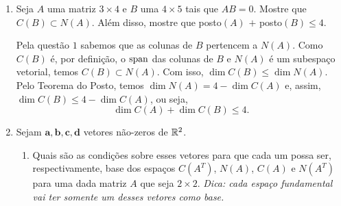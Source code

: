 \documentclass[leqno]{article}
\begin{document}
\begin{enumerate}
\begin{sol}
\end{sol} 



\item Seja $A$ uma matriz $3 \times 4$ e $B$ uma $4 \times 5$ tais que $AB = 0$. Mostre que $C(B) \subset N(A)$. Além disso, mostre que posto$(A)$ $ + $ posto$(B) \leq 4$.

\begin{sol} 

    Pela questão \( 1 \) sabemos que as colunas de \( B \) pertencem a \( N ( A ) \).
    Como \( C ( B ) \) é, por definição, o \( \operatorname{span} \) das colunas de \( B \) e \( N ( A ) \) é um subespaço vetorial, temos \( C ( B ) \subset N ( A ) \).
    Com isso, \( \dim C ( B ) \leq \dim N ( A ) \).
    Pelo Teorema do Posto, temos \( \dim N ( A ) = 4 - \dim C ( A ) \) e, assim, \( \dim C ( B ) \leq 4 - \dim C ( A ) \), ou seja,
    \begin{equation*}
        \dim C ( A ) + \dim C ( B ) \leq 4
    .\end{equation*}

\end{sol} 



\item Sejam $\mathbf{a,b,c,d}$ vetores não-zeros de $\mathbb{R}^2$.

\begin{enumerate}

\item Quais são as condições sobre esses vetores para que cada um possa ser, respectivamente, base dos espaços $C(A^T)$, $N(A)$, $C(A)$ e $N(A^T)$ para uma dada matriz $A$ que seja $2 \times 2$. \textit{Dica: cada espaço fundamental vai ter somente um desses vetores como base.}

\begin{sol} 


\end{sol}
\end{enumerate}
\end{enumerate}
\end{document}
